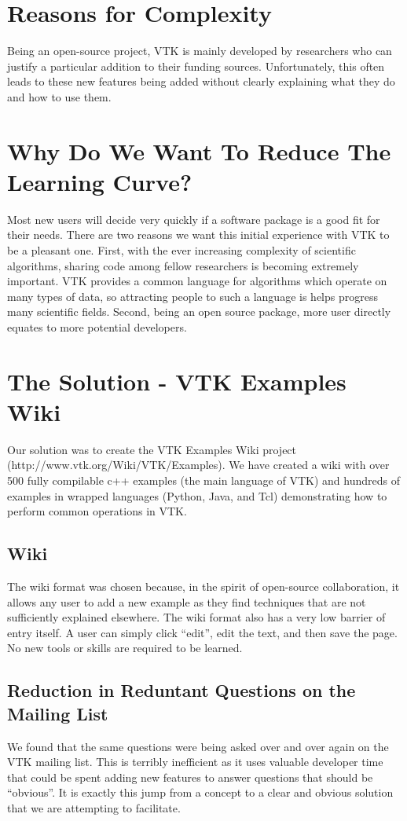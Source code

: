 \documentclass[a4paper,10pt]{IEEEtran}
\begin{document}
\section{Reasons for Complexity}
Being an open-source project, VTK is mainly developed by researchers who can justify a particular addition to their funding sources. Unfortunately, this often leads to these new features being added without clearly explaining what they do and how to use them.

\section{Why Do We Want To Reduce The Learning Curve?}
Most new users will decide very quickly if a software package is a good fit for their needs. There are two reasons we want this initial experience with VTK to be a pleasant one. First, with the ever increasing complexity of scientific algorithms, sharing code among fellow researchers is becoming extremely important. VTK provides a common language for algorithms which operate on many types of data, so attracting people to such a language is helps progress many scientific fields. Second, being an open source package, more user directly equates to more potential developers. 

\section{The Solution - VTK Examples Wiki}
Our solution was to create the VTK Examples Wiki project (http://www.vtk.org/Wiki/VTK/Examples). We have created a wiki with over 500 fully compilable c++ examples (the main language of VTK) and hundreds of examples in wrapped languages (Python, Java, and Tcl) demonstrating how to perform common operations in VTK.

\subsection{Wiki}
The wiki format was chosen because, in the spirit of open-source collaboration, it allows any user to add a new example as they find techniques that are not sufficiently explained elsewhere. The wiki format also has a very low barrier of entry itself. A user can simply click ``edit'', edit the text, and then save the page. No new tools or skills are required to be learned.

\subsection{Reduction in Reduntant Questions on the Mailing List}
We found that the same questions were being asked over and over again on the VTK mailing list. This is terribly inefficient as it uses valuable developer time that could be spent adding new features to answer questions that should be ``obvious''. It is exactly this jump from a concept to a clear and obvious solution that we are attempting to facilitate.
\end{document}
